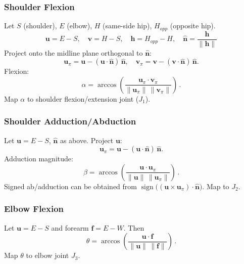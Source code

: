 \documentclass[manuscript,screen]{acmart} %
\begin{document}
\subsubsection{Shoulder Flexion}
Let $S$ (shoulder), $E$ (elbow), $H$ (same-side hip), $H_{opp}$ (opposite hip).
\begin{displaymath}
  \mathbf{u}=E-S,\quad \mathbf{v}=H-S,\quad \mathbf{h}=H_{opp}-H,\quad \hat{\mathbf{n}}=\frac{\mathbf{h}}{\lVert\mathbf{h}\rVert}
\end{displaymath}
Project onto the midline plane orthogonal to $\hat{\mathbf{n}}$:
\begin{displaymath}
\mathbf{u}_\pi=\mathbf{u}-(\mathbf{u}\cdot\hat{\mathbf{n}})\,\hat{\mathbf{n}},\quad
\mathbf{v}_\pi=\mathbf{v}-(\mathbf{v}\cdot\hat{\mathbf{n}})\,\hat{\mathbf{n}}.
\end{displaymath}
Flexion:
\begin{equation}
\alpha=\arccos \!\left( \frac{\mathbf{u}_\pi \cdot \mathbf{v}_\pi}{\lVert\mathbf{u}_\pi\rVert\, \lVert\mathbf{v}_\pi\rVert} \right)\,.
\end{equation}
Map $\alpha$ to shoulder flexion/extension joint ($J_1$).

\subsubsection{Shoulder Adduction/Abduction}
Let $\mathbf{u}=E-S$, $\hat{\mathbf{n}}$ as above. Project $\mathbf{u}$:
\begin{displaymath}
\mathbf{u}_\pi=\mathbf{u}-(\mathbf{u}\cdot\hat{\mathbf{n}})\,\hat{\mathbf{n}}.
\end{displaymath}
Adduction magnitude:
\begin{equation}
\beta=\arccos \!\left( \frac{\mathbf{u}\cdot\mathbf{u}_\pi}{\lVert\mathbf{u}\rVert\, \lVert\mathbf{u}_\pi\rVert} \right)\,.
\end{equation}
Signed ab/adduction can be obtained from $\operatorname{sign}\big((\mathbf{u}\times\mathbf{u}_\pi)\cdot\hat{\mathbf{n}}\big)$. Map to $J_2$.

\subsubsection{Elbow Flexion}
Let $\mathbf{u}=E-S$ and forearm $\mathbf{f}=E-W$. Then
\begin{equation}
\theta=\arccos \!\left( \frac{\mathbf{u}\cdot\mathbf{f}}{\lVert\mathbf{u}\rVert\, \lVert\mathbf{f}\rVert} \right)\,.
\end{equation}
Map $\theta$ to elbow joint $J_3$.
\end{document}
